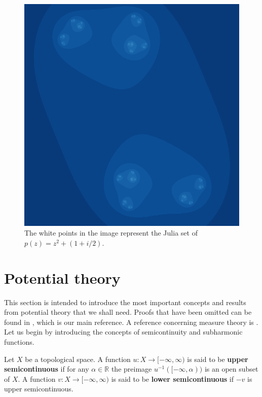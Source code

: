 \begin{figure}[h!]
	\centering
  \includegraphics[scale=.4]{notdendrite}
  \caption{The white points in the image represent the Julia set of $p(z) = z^2+(1+i/2)$.}
  \label{fig:nodendrita}
\end{figure}

\section{Potential theory}

This section is intended to introduce the most important concepts and results from potential theory that we shall need. Proofs that have been omitted  can be found in \cite{ransford}, which is our main reference. A reference concerning measure theory is \cite{bartle}.\\
Let us begin by introducing the concepts of semicontinuity and subharmonic functions.
\begin{mydef}[breakable]{}{}
Let $X$ be a topological space. A function $u:X\rightarrow [-\infty,\infty)$ is said to be {\bf upper semicontinuous} if for any $\alpha\in \mathbb{R}$ the preimage $u^{-1}([-\infty,\alpha))$ is an open subset of $X$. A function $v:X\rightarrow [-\infty,\infty)$ is said to be {\bf lower semicontinuous} if $-v$ is upper semicontinuous.
\end{mydef}


